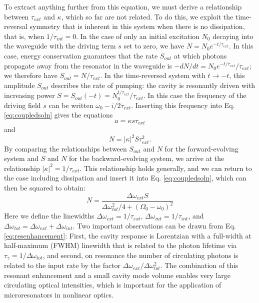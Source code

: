  To extract anything further from this equation, we must derive a relationship between $\tau_{ext}$ and $\kappa$, which so far are not related. To do this, we exploit the time-reversal symmetry that is inherent in this system when there is no dissipation, that is, when $1/\tau_{int}=0$. In the case of only an initial excitation $N_0$ decaying into the waveguide with the driving term $s$ set to zero, we have $N=N_0e^{-t/\tau_{ext}}$. In this case, energy conservation guarantees that the rate $S_{out}$ at which photons propagate away from the resonator in the waveguide is $-dN/dt=N_0e^{-t/\tau_{ext}}/\tau_{ext}$; we therefore have $S_{out}=N/\tau_{ext}$. In the time-reversed system with $t\rightarrow-t$, this amplitude $S_{out}$ describes the rate of pumping: the cavity is resonantly driven with increasing power $S=S_{out}(-t)=N_0^{t/\tau_{ext}}/\tau_{ext}$. In this case the frequency of the driving field $s$ can be written $\omega_0-i/2\tau_{ext}$. Inserting this frequency into Eq. \ref{eq:coupledsoln} gives the equations
 \begin{equation}
  a=\kappa s \tau_{ext}
  \end{equation}
  and
  \begin{equation}
   N=|\kappa|^2 S \tau_{ext}^2.
   \end{equation}
   By comparing the relationships between $S_{out}$ and $N$ for the forward-evolving system and $S$ and $N$ for the backward-evolving system, we arrive at the relationship $|\kappa|^2=1/\tau_{ext}$. This relationship holds generally, and we can return to the case including dissipation and insert it into Eq. \ref{eq:coupledsoln}, which can then be squared to obtain:
   \begin{equation}
   N=\frac{\Delta\omega_{ext}S}{\Delta\omega_{tot}^2/4+(\Omega_0-\omega_0)^2} \label{eq:resenhancement}
   \end{equation}
   Here we define the linewidths $\Delta\omega_{ext}=1/\tau_{ext}$, $\Delta\omega_{int}=1/\tau_{int}$, and $\Delta\omega_{tot}=\Delta\omega_{ext}+\Delta\omega_{int}$. Two important observations can be drawn from Eq. \ref{eq:resenhancement}: First, the cavity response is Lorentzian with a full-width at half-maximum (FWHM) linewidth that is related to the photon lifetime via $\tau_\gamma=1/\Delta\omega_{tot}$, and second, on resonance the number of circulating photons is related to the input rate by the factor $\Delta\omega_{ext}/\Delta\omega_{tot}^2$. The combination of this resonant enhancement and a small cavity mode volume enables very large circulating optical intensities, which is important for the application of microresonators in nonlinear optics.
   
